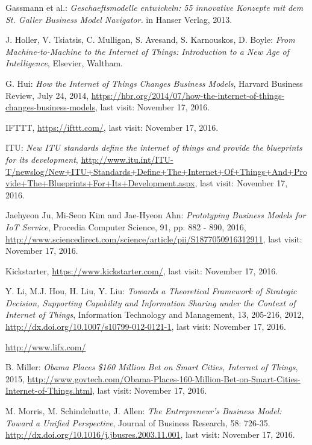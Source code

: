 \begin{thebibliography}{99}
	 Gassmann et al.: \emph{Geschaeftsmodelle entwickeln: 55 innovative Konzepte mit dem St. Galler Business Model Navigator.} in Hanser Verlag, 2013.

	 J. Holler, V. Tsiatsis, C. Mulligan, S. Avesand, S. Karnouskos, D. Boyle: \emph{From Machine-to-Machine to the Internet of Things: Introduction to a New Age of Intelligence}, Elsevier, Waltham.
	
	 G. Hui: \emph{How the Internet of Things Changes Business Models}, Harvard Business Review, July 24, 2014, \url{https://hbr.org/2014/07/how-the-internet-of-things-changes-business-models}, last visit: November 17, 2016.

 	 IFTTT, \url{https://ifttt.com/}, last visit: November 17, 2016.

 	 ITU: \emph{New ITU standards define the internet of things and provide the blueprints for its development}, \url{http://www.itu.int/ITU-T/newslog/New+ITU+Standards+Define+The+Internet+Of+Things+And+Provide+The+Blueprints+For+Its+Development.aspx}, last visit: November 17, 2016.

 	 Jaehyeon Ju, Mi-Seon Kim and Jae-Hyeon Ahn: \emph{Prototyping Business Models for IoT Service}, Procedia Computer Science, 91, pp. 882 - 890, 2016, \url{http://www.sciencedirect.com/science/article/pii/S1877050916312911}, last visit: November 17, 2016.
 	
 	 Kickstarter, \url{https://www.kickstarter.com/}, last visit: November 17, 2016.

	 Y. Li, M.J. Hou, H. Liu, Y. Liu: \emph{Towards a Theoretical Framework of Strategic Decision, Supporting Capability and Information Sharing under the Context of Internet of Things}, Information Technology and Management, 13, 205-216, 2012, \url{http://dx.doi.org/10.1007/s10799-012-0121-1}, last visit: November 17, 2016.

  	 \url{http://www.lifx.com/}

	 B. Miller: \emph{Obama Places \$160 Million Bet on Smart Cities, Internet of Things}, 2015, \url{http://www.govtech.com/Obama-Places-160-Million-Bet-on-Smart-Cities-Internet-of-Things.html}, last visit: November 17, 2016.

	 M. Morris, M. Schindehutte, J. Allen: \emph{The Entrepreneur's Business Model: Toward a Unified Perspective}, Journal of Business Research, 58: 726-35. \url{http://dx.doi.org/10.1016/j.jbusres.2003.11.001}, last visit: November 17, 2016.


\end{thebibliography}
